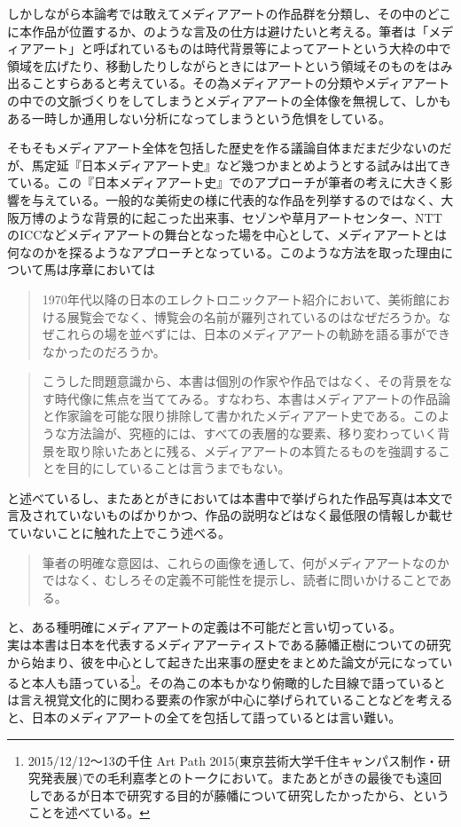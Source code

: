 \documentclass[a4paper,report]{jsbook}
\begin{document}
しかしながら本論考では敢えてメディアアートの作品群を分類し、その中のどこに本作品が位置するか、のような言及の仕方は避けたいと考える。筆者は「メディアアート」と呼ばれているものは時代背景等によってアートという大枠の中で領域を広げたり、移動したりしながらときにはアートという領域そのものをはみ出ることすらあると考えている。その為メディアアートの分類やメディアアートの中での文脈づくりをしてしまうとメディアアートの全体像を無視して、しかもある一時しか通用しない分析になってしまうという危惧をしている。

そもそもメディアアート全体を包括した歴史を作る議論自体まだまだ少ないのだが、馬定延『日本メディアアート史』など幾つかまとめようとする試みは出てきている。この『日本メディアアート史』でのアプローチが筆者の考えに大きく影響を与えている。一般的な美術史の様に代表的な作品を列挙するのではなく、大阪万博のような背景的に起こった出来事、セゾンや草月アートセンター、NTTのICCなどメディアアートの舞台となった場を中心として、メディアアートとは何なのかを探るようなアプローチとなっている。このような方法を取った理由について馬は序章においては

\begin{quote}
1970年代以降の日本のエレクトロニックアート紹介において、美術館における展覧会でなく、博覧会の名前が羅列されているのはなぜだろうか。なぜこれらの場を並べずには、日本のメディアアートの軌跡を語る事ができなかったのだろうか。
\end{quote}

\begin{quote}
こうした問題意識から、本書は個別の作家や作品ではなく、その背景をなす時代像に焦点を当ててみる。すなわち、本書はメディアアートの作品論と作家論を可能な限り排除して書かれたメディアアート史である。このような方法論が、究極的には、すべての表層的な要素、移り変わっていく背景を取り除いたあとに残る、メディアアートの本質たるものを強調することを目的にしていることは言うまでもない。
\end{quote}

と述べているし、またあとがきにおいては本書中で挙げられた作品写真は本文で言及されていないものばかりかつ、作品の説明などはなく最低限の情報しか載せていないことに触れた上でこう述べる。

\begin{quote}
筆者の明確な意図は、これらの画像を通して、何がメディアアートなのかではなく、むしろその定義不可能性を提示し、読者に問いかけることである。
\end{quote}

と、ある種明確にメディアアートの定義は不可能だと言い切っている。\\
実は本書は日本を代表するメディアアーティストである藤幡正樹についての研究から始まり、彼を中心として起きた出来事の歴史をまとめた論文が元になっていると本人も語っている\footnote{2015/12/12〜13の千住
  Art Path
  2015(東京芸術大学千住キャンパス制作・研究発表展)での毛利嘉孝とのトークにおいて。またあとがきの最後でも遠回しであるが日本で研究する目的が藤幡について研究したかったから、ということを述べている。}。その為この本もかなり俯瞰的した目線で語っているとは言え視覚文化的に関わる要素の作家が中心に挙げられていることなどを考えると、日本のメディアアートの全てを包括して語っているとは言い難い。
\end{document}

